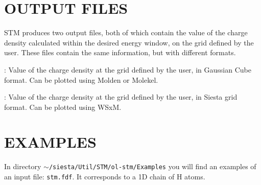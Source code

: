 \section{OUTPUT FILES}
\label{cap:output} 

{\sc STM} produces two output files, both of which contain
the value of the charge density calculated within the
desired energy window, on the grid defined by the user.
These files contain the same information, but with different
formats.

\begin{description}
\itemsep 10pt
\parsep 0pt

\item[{\bf {\it SystemLabel}.STM.cube}]:
Value of the charge density at the grid defined by the user,
in Gaussian Cube format. Can be plotted using {\sc Molden}
or {\sc Molekel}.

\item[{\bf {\it SystemLabel}.STM.siesta}]:
Value of the charge density at the grid defined by the user,
in {\sc Siesta} grid format. Can be plotted using WSxM.


\end{description}



\section{EXAMPLES}

In directory {\tt $\sim$/siesta/Util/STM/ol-stm/Examples} you will find an
examples of an input file: {\tt stm.fdf}.  It corresponds
to a 1D chain of H atoms.



